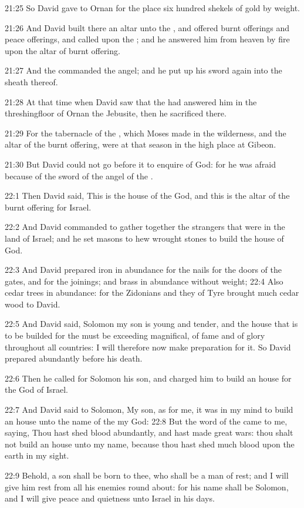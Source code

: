 21:25 So David gave to Ornan for the place six hundred shekels of gold by weight.

21:26 And David built there an altar unto the \LORD, and offered burnt offerings and peace offerings, and called upon the \LORD; and he answered him from heaven by fire upon the altar of burnt offering.

21:27 And the \LORD commanded the angel; and he put up his sword again into the sheath thereof.

21:28 At that time when David saw that the \LORD had answered him in the threshingfloor of Ornan the Jebusite, then he sacrificed there.

21:29 For the tabernacle of the \LORD, which Moses made in the wilderness, and the altar of the burnt offering, were at that season in the high place at Gibeon.

21:30 But David could not go before it to enquire of God: for he was afraid because of the sword of the angel of the \LORD.

22:1 Then David said, This is the house of the \LORD God, and this is the altar of the burnt offering for Israel.

22:2 And David commanded to gather together the strangers that were in the land of Israel; and he set masons to hew wrought stones to build the house of God.

22:3 And David prepared iron in abundance for the nails for the doors of the gates, and for the joinings; and brass in abundance without weight; 22:4 Also cedar trees in abundance: for the Zidonians and they of Tyre brought much cedar wood to David.

22:5 And David said, Solomon my son is young and tender, and the house that is to be builded for the \LORD must be exceeding magnifical, of fame and of glory throughout all countries: I will therefore now make preparation for it. So David prepared abundantly before his death.

22:6 Then he called for Solomon his son, and charged him to build an house for the \LORD God of Israel.

22:7 And David said to Solomon, My son, as for me, it was in my mind to build an house unto the name of the \LORD my God: 22:8 But the word of the \LORD came to me, saying, Thou hast shed blood abundantly, and hast made great wars: thou shalt not build an house unto my name, because thou hast shed much blood upon the earth in my sight.

22:9 Behold, a son shall be born to thee, who shall be a man of rest; and I will give him rest from all his enemies round about: for his name shall be Solomon, and I will give peace and quietness unto Israel in his days.

